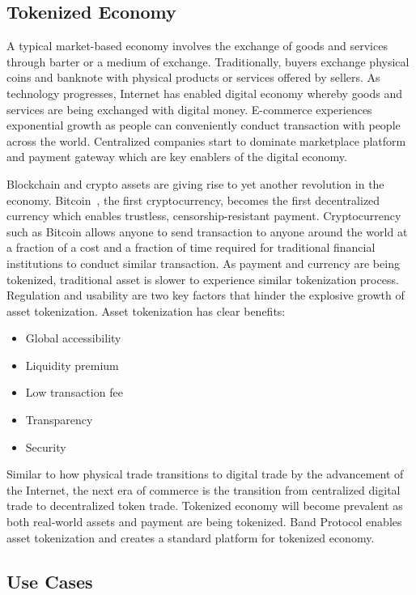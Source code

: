 \documentclass[letterpaper,11pt]{article}
\begin{document}
\subsection{Tokenized Economy}

A typical market-based economy involves the exchange of goods and services through barter or a medium of exchange. Traditionally, buyers exchange physical coins and banknote with physical products or services offered by sellers. As technology progresses, Internet has enabled digital economy whereby goods and services are being exchanged with digital money. E-commerce experiences exponential growth as people can conveniently conduct transaction with people across the world. Centralized companies start to dominate marketplace platform and payment gateway which are key enablers of the digital economy.

Blockchain and crypto assets are giving rise to yet another revolution in the economy. Bitcoin~\cite{nakamoto}, the first cryptocurrency, becomes the first decentralized currency which enables trustless, censorship-resistant payment. Cryptocurrency such as Bitcoin allows anyone to send transaction to anyone around the world at a fraction of a cost and a fraction of time required for traditional financial institutions to conduct similar transaction. As payment and currency are being tokenized, traditional asset is slower to experience similar tokenization process. Regulation and usability are two key factors that hinder the explosive growth of asset tokenization. Asset tokenization has clear benefits:
\begin{itemize}
\item Global accessibility
\item Liquidity premium
\item Low transaction fee
\item Transparency
\item Security
\end{itemize}

Similar to how physical trade transitions to digital trade by the advancement of the Internet, the next era of commerce is the transition from centralized digital trade to decentralized token trade. Tokenized economy will become prevalent as both real-world assets and payment are being tokenized. Band Protocol enables asset tokenization and creates a standard platform for tokenized economy.
\newpage

\subsection{Use Cases}
\end{document}
